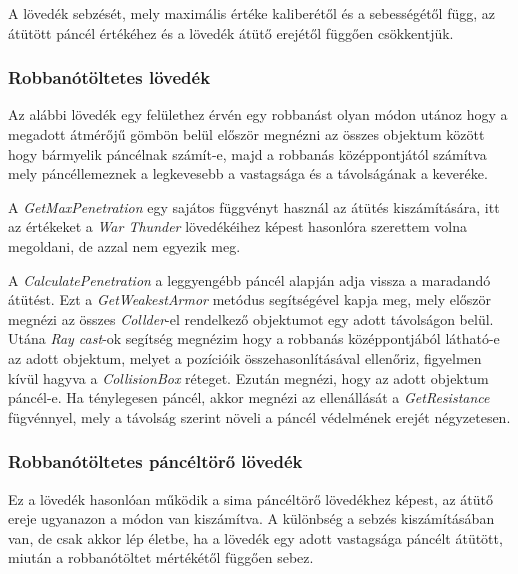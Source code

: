 \documentclass[
]{thesis-ekf}
\theoremstyle{definition}
\theoremstyle{remark}
\begin{document}


A lövedék sebzését, mely maximális értéke kaliberétől és a sebességétől függ, az átütött páncél értékéhez és a lövedék átütő erejétől függően csökkentjük.

\subsubsection{Robbanótöltetes lövedék}

Az alábbi lövedék egy felülethez érvén egy robbanást olyan módon utánoz hogy a megadott átmérőjű gömbön belül először megnézni az összes objektum között hogy bármyelik páncélnak számít-e, majd a robbanás középpontjától számítva mely páncéllemeznek a legkevesebb a vastagsága és a távolságának a keveréke.



A \emph{GetMaxPenetration} egy sajátos függvényt használ az átütés kiszámítására, itt az értékeket a \emph{War Thunder} lövedékéihez képest hasonlóra szerettem volna megoldani, de azzal nem egyezik meg.

A \emph{CalculatePenetration} a leggyengébb páncél alapján adja vissza a maradandó átütést. Ezt a \emph{GetWeakestArmor} metódus segítségével kapja meg, mely először megnézi az összes \emph{Collder}-el rendelkező objektumot egy adott távolságon belül. Utána \emph{Ray cast}-ok segítség megnézim hogy a robbanás középpontjából látható-e az adott objektum, melyet a pozícióik összehasonlításával ellenőriz, figyelmen kívül hagyva a \emph{CollisionBox} réteget. Ezután megnézi, hogy az adott objektum páncél-e. Ha ténylegesen páncél, akkor megnézi az ellenállását a \emph{GetResistance} fügvénnyel, mely a távolság szerint növeli a páncél védelmének erejét négyzetesen.


\subsubsection{Robbanótöltetes páncéltörő lövedék}

Ez a lövedék hasonlóan működik a sima páncéltörő lövedékhez képest, az átütő ereje ugyanazon a módon van kiszámítva. A különbség a sebzés kiszámításában van, de csak akkor lép életbe, ha a lövedék egy adott vastagsága páncélt átütött, miután a robbanótöltet mértékétől függően sebez.
\end{document}
